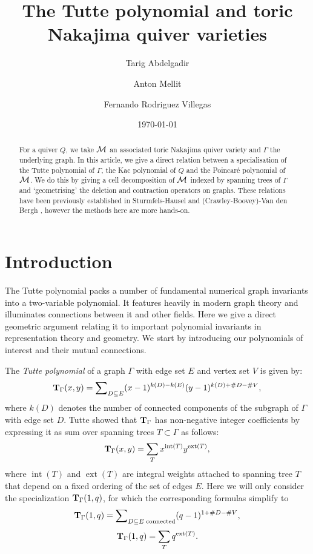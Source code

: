 \documentclass{amsart}
\title{The Tutte polynomial and toric Nakajima quiver varieties}
\author{Tarig Abdelgadir}
\author{Anton Mellit}
\author{Fernando Rodriguez Villegas}
\date{\today}
\theoremstyle{definition}
\DeclareMathOperator{\intact}{int}
\DeclareMathOperator{\extact}{ext}
\begin{document}
\maketitle

\begin{abstract}
For a quiver $Q$, we take $\mathcal{M}$ an associated toric Nakajima quiver variety and $\Gamma$ the underlying graph. In this article, we give a direct relation between a specialisation of the Tutte polynomial of $\Gamma$, the Kac polynomial of $Q$ and the Poincar\'e polynomial of $\mathcal{M}$.
We do this by giving a cell decomposition of $\mathcal{M}$ indexed by spanning trees of $\Gamma$ and `geometrising' the deletion and contraction operators on graphs.
These relations have been previously established in Sturmfels-Hausel \cite{hausel-sturmfels} and (Crawley-Boovey)-Van den Bergh \cite{CB-vdB}, however the methods here are more hands-on.
\end{abstract}

\section{Introduction}
The Tutte polynomial packs a number of fundamental numerical graph invariants into a two-variable polynomial.
It features heavily in modern graph theory and illuminates connections between it and other fields.
Here we give a direct geometric argument relating it to important polynomial invariants in representation theory and geometry.
We start by introducing our polynomials of interest and their mutual connections.

The {\it Tutte polynomial} of a graph $\Gamma$ with edge set $E$ and vertex set $V$ is given by:
$$
\mathbf{T}_{\Gamma}(x,y)=\sum \nolimits _{{D\subseteq E}}(x-1)^{{k(D)-k(E)}}(y-1)^{{k(D)+\#D-\#V}}, 
$$
where $k(D)$ denotes the number of connected components of the subgraph of $\Gamma$ with edge set $D$. 
Tutte showed that $\mathbf{T}_\Gamma$ has non-negative integer coefficients by expressing it as sum over spanning trees $T \subset \Gamma$ as follows:
$$
\bfT_\Gamma(x,y)=\sum_T x^{\intact(T)}y^{\extact(T)},
$$
where $\intact(T)$ and $\extact(T)$ are integral weights attached to spanning tree $T$ that depend on a fixed ordering of the set of edges $E$. Here we will only consider the specialization $\mathbf{T}_\Gamma(1,q)$, for which the corresponding formulas simplify to
\begin{equation}\label{eq:formula1}
\mathbf{T}_{\Gamma}(1,q)=\sum \nolimits _{{D\subseteq E\;\text{connected}}}(q-1)^{{1+\#D-\#V}}, 
\end{equation}
\begin{equation}\label{eq:formula2}
\bfT_{\Gamma}(1,q)=\sum_{T} q^{\extact(T)}.
\end{equation}
\end{document}
